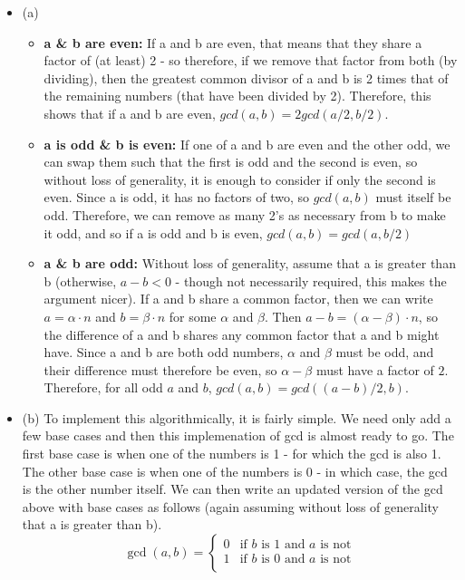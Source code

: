 \documentclass{article}
\begin{document}
\begin{solution}
\begin{itemize}
	\item[]{(a)}
			\begin{itemize}
				\item[]{\textbf{a \& b are even:}} If a and b are even, that means that they share a factor of (at least) 2 - so therefore, if we remove that factor from both (by dividing), then the greatest common divisor of a and b is 2 times that of the remaining numbers (that have been divided by 2).  Therefore, this shows that if a and b are even, $gcd(a,b) = 2gcd(a/2,b/2)$.
				\item[]{\textbf{a is odd \& b is even:}} If one of a and b are even and the other odd, we can swap them such that the first is odd and the second is even, so without loss of generality, it is enough to consider if only the second is even.  Since a is odd, it has no factors of two, so $gcd(a,b)$ must itself be odd.  Therefore, we can remove as many 2's as necessary from b to make it odd, and so if a is odd and b is even, $gcd(a,b) = gcd(a,b/2)$
				\item[]{\textbf{a \& b are odd:}} Without loss of generality, assume that a is greater than b (otherwise, $a-b < 0$ - though not necessarily required, this makes the argument nicer).  If a and b share a common factor, then we can write $a=\alpha \cdot n$ and $b=\beta \cdot n$ for some $\alpha$ and $\beta$.  Then $a-b=(\alpha - \beta)\cdot n$, so the difference of a and b shares any common factor that a and b might have.  Since a and b are both odd numbers, $\alpha$ and $\beta$ must be odd, and their difference must therefore be even, so $\alpha - \beta$ must have a factor of $2$.  Therefore, for all odd $a$ and $b$, $gcd(a,b)=gcd((a-b)/2,b)$.
			\end{itemize}
	\item[]{(b)} To implement this algorithmically, it is fairly simple.  We need only add a few base cases and then this implemenation of gcd is almost ready to go.  The first base case is when one of the numbers is 1 - for which the gcd is also 1.  The other base case is when one of the numbers is 0 - in which case, the gcd is the other number itself.  We can then write an updated version of the gcd above with base cases as follows (again assuming without loss of generality that a is greater than b).
	$$\gcd(a, b) = \begin{cases}
	0 & \text{if $b$ is 1 and $a$ is not} \\
	1 & \text{if $b$ is 0 and $a$ is not} \\

\end{cases}$$
\end{itemize}
\end{solution}
\end{document}

